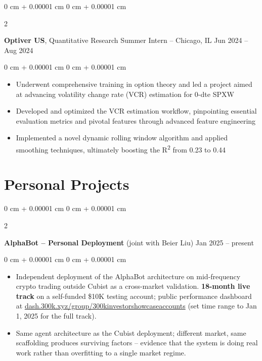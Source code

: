 \documentclass[10pt, letterpaper]{article}
\newenvironment{highlights}{
    \begin{itemize}[
        topsep=0.10 cm,
        parsep=0.10 cm,
        partopsep=0pt,
        itemsep=0pt,
        leftmargin=0 cm + 10pt
    ]
}{
    \end{itemize}
} %
\newenvironment{onecolentry}{
    \begin{adjustwidth}{
        0 cm + 0.00001 cm
    }{
        0 cm + 0.00001 cm
    }
}{
    \end{adjustwidth}
} %
\newenvironment{twocolentry}[2][]{
    \onecolentry
    \def\secondColumn{#2}
    \setcolumnwidth{\fill, 4.5 cm}
    \begin{paracol}{2}
}{
    \switchcolumn \raggedleft \secondColumn
    \end{paracol}
    \endonecolentry
} %
\begin{document}
        \vspace{0.2 cm}


        \begin{twocolentry}{
            Jun 2024 – Aug 2024
        }
            \textbf{Optiver US}, Quantitative Research Summer Intern -- Chicago, IL\end{twocolentry}

        \vspace{0.10 cm}
        \begin{onecolentry}
            \begin{highlights}
                \item Underwent comprehensive training in option theory and led a project aimed at advancing volatility change rate (VCR) estimation for 0-dte SPXW
                \item Developed and optimized the VCR estimation workflow, pinpointing essential evaluation metrics and pivotal features through advanced feature engineering
                \item Implemented a novel dynamic rolling window algorithm and applied smoothing techniques, ultimately boosting the R\textsuperscript{2} from 0.23 to 0.44
            \end{highlights}
        \end{onecolentry}


    \section{Personal Projects}


        \begin{twocolentry}{
            Jan 2025 – present
        }
            \textbf{AlphaBot -- Personal Deployment} (joint with Beier Liu)\end{twocolentry}

        \vspace{0.10 cm}
        \begin{onecolentry}
            \begin{highlights}
                \item Independent deployment of the AlphaBot architecture on mid-frequency crypto trading outside Cubist as a cross-market validation. \textbf{18-month live track} on a self-funded \$10K testing account; public performance dashboard at \href{https://dash.300k.xyz/group/300kinvestorshowcaseaccounts}{dash.300k.xyz/group/300kinvestorshowcaseaccounts} (set time range to Jan 1, 2025 for the full track).
                \item Same agent architecture as the Cubist deployment; different market, same scaffolding produces surviving factors -- evidence that the system is doing real work rather than overfitting to a single market regime.
            \end{highlights}
        \end{onecolentry}
\end{document}
